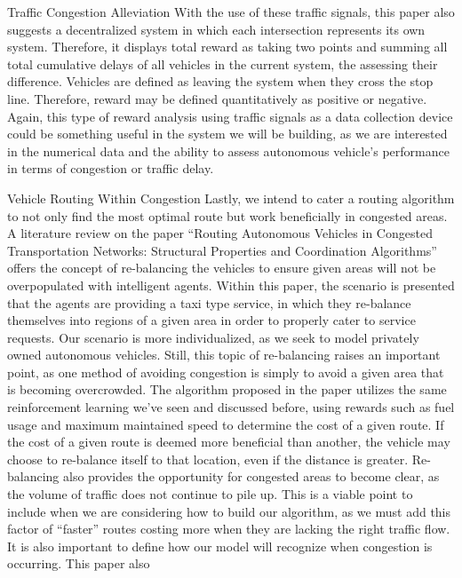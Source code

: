 \documentclass[letterpaper,10pt,draftclsnofoot,onecolumn]{IEEEtran} %
\begin{document}
\begin{section}{Traffic Congestion Alleviation}
With the use of these traffic signals, this paper also suggests a decentralized system in which each intersection
represents its own system. Therefore, it displays total reward as taking two points and summing all total cumulative
delays of all vehicles in the current system, the assessing their difference. Vehicles are defined as leaving the system
when they cross the stop line. Therefore, reward may be defined quantitatively as positive or negative. Again, this
type of reward analysis using traffic signals as a data collection device could be something useful in the system we
will be building, as we are interested in the numerical data and the ability to assess autonomous vehicle’s performance
in terms of congestion or traffic delay.
\end{section}

\begin{section}{Vehicle Routing Within Congestion}
Lastly, we intend to cater a routing algorithm to not only find the most optimal route but work beneficially
in congested areas. A literature review on the paper “Routing Autonomous Vehicles in Congested Transportation
Networks: Structural Properties and Coordination Algorithms”
\cite{Routing:2016} offers the concept of re-balancing the vehicles to
ensure given areas will not be overpopulated with intelligent agents. Within this paper, the scenario is presented that
the agents are providing a taxi type service, in which they re-balance themselves into regions of a given area in order
to properly cater to service requests. Our scenario is more individualized, as we seek to model privately owned
autonomous vehicles. Still, this topic of re-balancing raises an important point, as one method of avoiding congestion
is simply to avoid a given area that is becoming overcrowded. The algorithm proposed in the paper utilizes the same
reinforcement learning we've seen and discussed before, using rewards such as fuel usage and maximum maintained
speed to determine the cost of a given route. If the cost of a given route is deemed more beneficial than another, the
vehicle may choose to re-balance itself to that location, even if the distance is greater. Re-balancing also provides the
opportunity for congested areas to become clear, as the volume of traffic does not continue to pile up. This is a viable
point to include when we are considering how to build our algorithm, as we must add this factor of “faster” routes
costing more when they are lacking the right traffic flow.
It is also important to define how our model will recognize when congestion is occurring. This paper also

\end{section}
\end{document}
